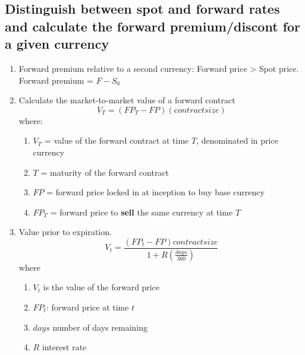 \documentclass{article}
\newcommand{\be}{\begin{enumerate}}
\newcommand{\ee}{\end{enumerate}}
\begin{document}
\subsection{Distinguish between spot and forward rates and calculate the forward
premium/discont for a given currency}
\be
    \item Forward premium relative to a second currency: 
        Forward price > Spot price. Forward premium = $F-S_0$
    \item Calculate the market-to-market value of a forward contract
            $$
                V_T=(FP_T-FP)(contract size)
            $$
            where:
            \be
                \item $V_T$ = value of the forward contract at time $T$, denominated
                    in price currency
                \item $T$ = maturity of the forward contract
                \item $FP$ = forward price locked in at inception to buy base currency
                \item $FP_T$ = forward price to {\bf sell} the same currency at time $T$
            \ee
    \item Value prior to expiration.
    $$
    V_t=\frac{(FP_t-FP)contract size}{1+R(\frac{days}{360})}
    $$
    where 
    \be
        \item $V_t$ is the value of the forward price
        \item $FP_t$: forward price at time $t$
        \item $days$ number of days remaining
        \item $R$ interest rate
    \ee
\ee
\end{document}
